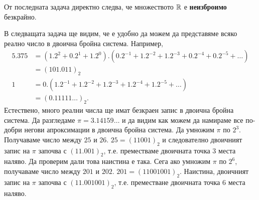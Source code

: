 \begin{remark}
  От последната задача директно следва, че множеството $\mathbb{R}$ е {\bf неизброимо} безкрайно.
\end{remark}


В следващата задача ще видим, че е удобно да можем да представяме 
всяко реално число в двоична бройна система.
Например,
\begin{align*}
  5.375 & = (1.2^2 + 0.2^1 + 1.2^0).(0.2^{-1} + 1.2^{-2} + 1.2^{-3} + 0.2^{-4} + 0.2^{-5} + \dots)\\
  & = (101.011)_2\\
  1 & = 0.(1.2^{-1} + 1.2^{-2} + 1.2^{-3} + 1.2^{-4} + 1.2^{-5} + \dots)\\
  & = (0.11111\dots)_2.
\end{align*}
Естествено, много реални числа ще имат безкраен запис в двоична бройна система.
Да разгледаме $\pi = 3.14159\dots$ и да видим как можем да намираме все по-добри негови 
апроксимации в двоична бройна система.
Да умножим $\pi$ по $2^3$. Получаваме число между $25$ и $26$. 
$25 = (11001)_2$ и следователно двоичният запис на $\pi$ започва с $(11.001)_2$, т.е.
преместваме двоичната точка $3$ места наляво. Да проверим дали това наистина е така.
Сега ако умножим $\pi$ по $2^6$, получаваме число между $201$ и $202$.
$201 = (11001001)_2$. Наистина, двоичният запис на $\pi$ започва с $(11.001001)_2$,
т.е. преместване двоичната точка $6$ места наляво.


